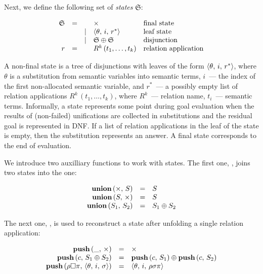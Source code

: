Next, we define the following set of \emph{states} $\mathfrak{S}$:

\[
\begin{array}{rccll}
  \mathfrak{S} & = &     & \times                         & \mbox{final state}\\
               &   &\mid & \langle \theta,\,i,\,r^* \rangle        & \mbox{leaf state}\\
               &   &\mid & \mathfrak{S}\oplus\mathfrak{S} & \mbox{disjunction}\\
  r            & = &     & R^k\,(t_1,\dots,t_k)            & \mbox{relation application}
\end{array}
\]

A non-final state is a tree of disjunctions with leaves of the form $\langle \theta,\,i,\,r^* \rangle$, where $\theta$ is a substitution from semantic variables into semantic terms,
$i$~--- the index of the first non-allocated semantic variable, and $r^*$~--- a possibly empty list of relation applications $R^k\,(t_1,\dots,t_k)$, where $R^k$~--- relation name,
$t_i$~--- semantic terms. Informally, a state represents some point during goal evaluation when the results of (non-failed) unifications are collected in substitutions and the residual
goal is represented in DNF. If a list of relation applications in the leaf of the state is empty, then the substitution represents an answer. A final state corresponds to the end of evaluation.

We introduce two auxilliary functions to work with states. The first one, , joins two states into the one:

\[
\begin{array}{rcl}
  \mbox{\bf union}\,(\times,\, S) & = & S \\
  \mbox{\bf union}\,(S,\, \times) & = & S \\
  \mbox{\bf union}\,(S_1,\, S_2) & = & S_1\oplus S_2
\end{array}
\]

The next one, , is used to reconstruct a state after unfolding a single relation application:

\[
\begin{array}{rcl}
  \mbox{\bf push}\,(\_,\,\times) & = & \times\\
  \mbox{\bf push}\,(c,\,S_1\oplus S_2) & = & \mbox{\bf push}\,(c,\,S_1)\oplus\mbox{\bf push}\,(c,\,S_2)\\
  \mbox{\bf push}\,(\rho\Box\pi,\,\langle \theta,\,i,\,\sigma \rangle) & = & \langle \theta,\,i,\,\rho\sigma\pi \rangle
\end{array}
\]

